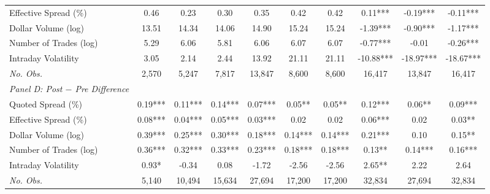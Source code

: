 \begin{table}[!htp]
\begin{adjustbox}{max width=\textwidth}
\begin{tabular}{lccccccccc}
Effective Spread (\%) & 0.46 & 0.23 & 0.30 & 0.35 & 0.42 & 0.42 & 0.11*** & -0.19*** & -0.11*** \\
Dollar Volume (log) & 13.51 & 14.34 & 14.06 & 14.90 & 15.24 & 15.24 & -1.39*** & -0.90*** & -1.17*** \\
Number of Trades (log) & 5.29 & 6.06 & 5.81 & 6.06 & 6.07 & 6.07 & -0.77*** & -0.01 & -0.26*** \\
Intraday Volatility & 3.05 & 2.14 & 2.44 & 13.92 & 21.11 & 21.11 & -10.88*** & -18.97*** & -18.67*** \\
\textit{No. Obs.} &  2,570  &  5,247  &  7,817  &  13,847  &  8,600  &  8,600  &  16,417  &  13,847  &  16,417  \\
\cmidrule{1-10}
\textit{Panel D: Post $-$ Pre Difference} \\
\cmidrule{1-10}
Quoted Spread (\%) & 0.19*** & 0.11*** & 0.14*** & 0.07*** & 0.05** & 0.05** & 0.12*** & 0.06** & 0.09*** \\
Effective Spread (\%) & 0.08*** & 0.04*** & 0.05*** & 0.03*** & 0.02 & 0.02 & 0.06*** & 0.02 & 0.03** \\
Dollar Volume (log) & 0.39*** & 0.25*** & 0.30*** & 0.18*** & 0.14*** & 0.14*** & 0.21*** & 0.10 & 0.15** \\
Number of Trades (log) & 0.36*** & 0.32*** & 0.33*** & 0.23*** & 0.18*** & 0.18*** & 0.13** & 0.14*** & 0.16*** \\
Intraday Volatility & 0.93* & -0.34 & 0.08 & -1.72 & -2.56 & -2.56 & 2.65** & 2.22 & 2.64 \\
\textit{No. Obs.} &  5,140  &  10,494  &  15,634  &  27,694  &  17,200  &  17,200  &  32,834  &  27,694  &  32,834  \\
\cmidrule{1-10}
\end{tabular}
 \end{adjustbox}
 \end{table}
